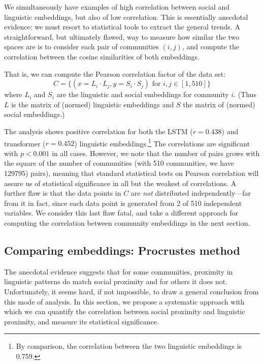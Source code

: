 \documentclass[11pt]{article}
\begin{document}
We simultaneously have examples of high correlation between social and
linguistic embeddings, but also of low correlation. This is
essentially anecdotal evidence: we must resort to statistical tools to
extract the general trends.
A straightforward, but ultimately flawed,
way to measure how similar the two spaces are is to consider each pair
of communities \((i,j)\), and compute the correlation between the
cosine similarities of both embeddings.

That is, we can compute the Pearson correlation factor of the data set:
\[C = \{(x = L_i · L_j, y = S_i · S_j) \text {~for~} i,j ∈
  [1,510]\}\] %
where \(L_i\) and \(S_i\) are the linguistic and social embeddings for
community \(i\).  (Thus \(L\) is the matrix of (normed) linguistic
embeddings and \(S\) the matrix of (normed) social embeddings.)

The analysis shows positive correlation for both the LSTM ($r=0.438$)
and transformer ($r=0.452$) linguistic embeddings.\footnote{ By
  comparison, the correlation between the two linguistic embeddings is
  \num{0.759}.}  The correlations are significant with $p<0.001$ in
all cases.  However, we note that the number of pairs grows with the
square of the number of communities (with 510 communities, we have
129795) pairs), meaning that standard statistical tests on Pearson
correlation will assure us of statistical significance in all but the
weakest of correlations. A further flaw is that the data points in
\(C\) are \emph{not} distributed independently---far from it in fact,
since each data point is generated from \num{2} of \num{510}
independent variables. We consider this last flaw fatal, and take a
different approach for computing the correlation between community
embeddings in the next section.


\subsection{Comparing embeddings: Procrustes method}
\label{sec:statistical-evidence}



The anecdotal evidence suggests that for some communities, proximity
in linguistic patterns do match social proximity and for others it
does not. Unfortunately, it seems hard, if not impossible, to draw a
general conclusion from this mode of analysis. In this section, we propose a
systematic approach with which we can quantify the correlation
between social proximity and linguistic proximity, and measure its
statistical significance.
\end{document}
